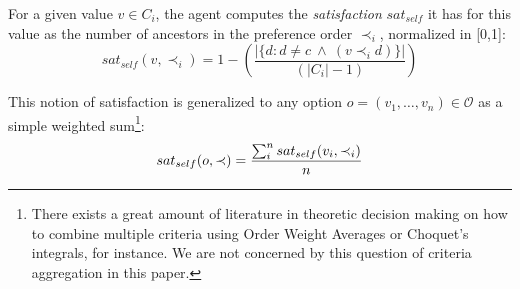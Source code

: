 \documentclass{llncs}
\begin{document}
	For a given value $v\in C_i$, the agent computes the \emph{satisfaction} $sat_{self}$ it has for this value as the number of ancestors in the preference order $\prec_i$, normalized in [0,1]:
		\vspace{-.5em} 
	\begin{equation}
	sat_{self}(v, \prec_i) =	1 - \left( \frac{|\{d : d \neq c \  \wedge \ (v \prec_i d)\}| }{( |C_i| - 1 )}\right)
	\end{equation}
	
	This notion of satisfaction is generalized to any option $o= (v_1, \ldots, v_n)\in \mathcal{O}$ as a simple weighted sum\footnote{There exists a great amount of literature in theoretic decision making on how to combine multiple criteria using Order Weight Averages or Choquet's integrals, for instance. We are not concerned by this question of criteria aggregation in this paper.}:
		\vspace{-1em} 
	\begin{equation}
	sat_{self}(o, \prec) = \frac{\sum_{i}^{n} sat_{self}(v_i, \prec_i) }{n}
		\vspace{-1.5em} 
	\end{equation}
\end{document}
